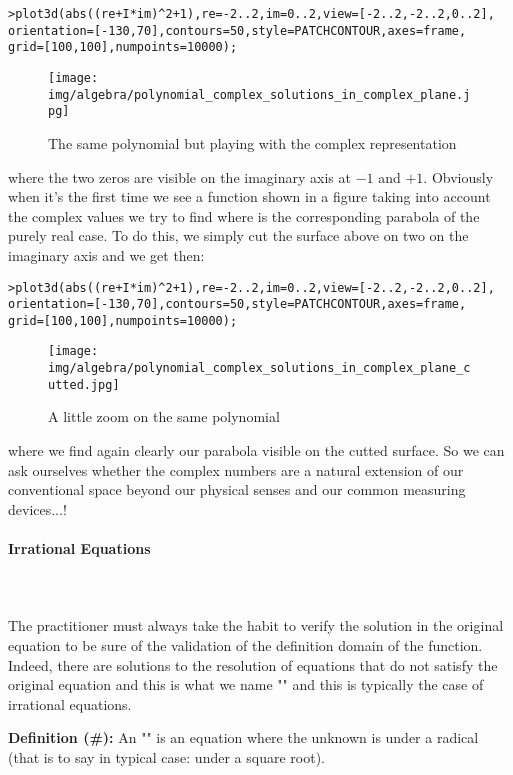 	\texttt{>plot3d(abs((re+I*im)\string^2+1),re=-2..2,im=0..2,view=[-2..2,-2..2,0..2],\\
	orientation=[-130,70],contours=50,style=PATCHCONTOUR,axes=frame,\\
	grid=[100,100],numpoints=10000);}
	\begin{figure}[H]
		\centering
		\texttt{[image: img/algebra/polynomial\_complex\_solutions\_in\_complex\_plane.jpg]}
		\caption[]{The same polynomial but playing with the complex representation}
	\end{figure}
	where the two zeros are visible on the imaginary axis at $-1$ and $+1$. Obviously when it's the first time we see a function shown in a figure taking into account the complex values we try to find where is the corresponding parabola of the purely real case. To do this, we simply cut the surface above on two on the imaginary axis and we get then:
	
	\texttt{>plot3d(abs((re+I*im)\string^2+1),re=-2..2,im=0..2,view=[-2..2,-2..2,0..2],\\
	orientation=[-130,70],contours=50,style=PATCHCONTOUR,axes=frame,\\
	grid=[100,100],numpoints=10000);}
	\begin{figure}[H]
		\centering
		\texttt{[image: img/algebra/polynomial\_complex\_solutions\_in\_complex\_plane\_cutted.jpg]}
		\caption[]{A little zoom on the same polynomial}
	\end{figure}
	where we find again clearly our parabola visible on the cutted surface. So we can ask ourselves whether the complex numbers are a natural extension of our conventional space beyond our physical senses and our common measuring devices...!

	\paragraph{Irrational Equations}\mbox{}\\\\
	The practitioner must always take the habit to verify the solution in the original equation to be sure of the validation of the definition domain of the function. Indeed, there are solutions to the resolution of equations that do not satisfy the original equation and this is what we name "" and this is typically the case of irrational equations. 

	\textbf{Definition  (\#\mydef):} An "" is an equation where the unknown is under a radical (that is to say in typical case: under a square root).
	
